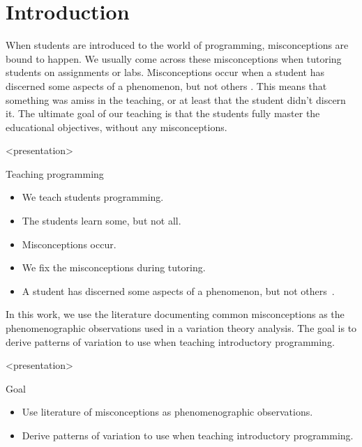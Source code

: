 \mode*
\section{Introduction}

When students are introduced to the world of programming, misconceptions are 
bound to happen.
We usually come across these misconceptions when tutoring students on 
assignments or labs.
Misconceptions occur when a student has discerned some aspects of a phenomenon,  
but not others \parencite{NCOL}.
This means that something was amiss in the teaching, or at least that the 
student didn't discern it.
The ultimate goal of our teaching is that the students fully master the 
educational objectives, without any misconceptions.

\begin{frame}<presentation>
  \begin{block}{Teaching programming}
    \begin{itemize}
      \item We teach students programming.
      \item The students learn some, but not all.
      \item Misconceptions occur.
      \item We fix the misconceptions during tutoring.
    \end{itemize}
  \end{block}

  \pause

  \begin{definition}[Misconception]
    \begin{itemize}
      \item A student has discerned some aspects of a phenomenon, but not 
        others~\parencite{NCOL}.
    \end{itemize}
  \end{definition}
\end{frame}

In this work, we use the literature documenting common misconceptions as the 
phenomenographic observations used in a variation theory analysis.
The goal is to derive patterns of variation to use when teaching introductory 
programming.

\begin{frame}<presentation>
  \begin{block}{Goal}
    \begin{itemize}
      \item Use literature of misconceptions as phenomenographic 
        observations.
      \item Derive patterns of variation to use when teaching introductory 
        programming.
    \end{itemize}
  \end{block}
\end{frame}

